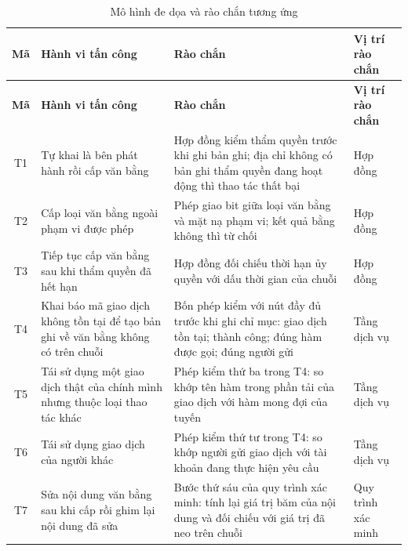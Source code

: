 \begin{longtable}{|c|p{3.6cm}|p{5.3cm}|p{3.4cm}|}
\caption{Mô hình đe dọa và rào chắn tương ứng}
\label{tab:threat-model} \\

\hline
\textbf{Mã} & \textbf{Hành vi tấn công} & \textbf{Rào chắn} & \textbf{Vị trí rào chắn} \\
\hline
\endfirsthead

\hline
\textbf{Mã} & \textbf{Hành vi tấn công} & \textbf{Rào chắn} & \textbf{Vị trí rào chắn} \\
\hline
\endhead

\hline
\endfoot

\hline
\endlastfoot

T1 & Tự khai là bên phát hành rồi cấp văn bằng
& Hợp đồng kiểm thẩm quyền trước khi ghi bản ghi; địa chỉ không có bản ghi thẩm quyền đang hoạt động thì thao tác thất bại
& Hợp đồng
\\ \hline

T2 & Cấp loại văn bằng ngoài phạm vi được phép
& Phép giao bit giữa loại văn bằng và mặt nạ phạm vi; kết quả bằng không thì từ chối
& Hợp đồng
\\ \hline

T3 & Tiếp tục cấp văn bằng sau khi thẩm quyền đã hết hạn
& Hợp đồng đối chiếu thời hạn ủy quyền với dấu thời gian của chuỗi
& Hợp đồng
\\ \hline

T4 & Khai báo mã giao dịch không tồn tại để tạo bản ghi về văn bằng không có trên chuỗi
& Bốn phép kiểm với nút đầy đủ trước khi ghi chỉ mục: giao dịch tồn tại; thành công; đúng hàm được gọi; đúng người gửi
& Tầng dịch vụ
\\ \hline

T5 & Tái sử dụng một giao dịch thật của chính mình nhưng thuộc loại thao tác khác
& Phép kiểm thứ ba trong T4: so khớp tên hàm trong phần tải của giao dịch với hàm mong đợi của tuyến
& Tầng dịch vụ
\\ \hline

T6 & Tái sử dụng giao dịch của người khác
& Phép kiểm thứ tư trong T4: so khớp người gửi giao dịch với tài khoản đang thực hiện yêu cầu
& Tầng dịch vụ
\\ \hline

T7 & Sửa nội dung văn bằng sau khi cấp rồi ghim lại nội dung đã sửa
& Bước thứ sáu của quy trình xác minh: tính lại giá trị băm của nội dung và đối chiếu với giá trị đã neo trên chuỗi
& Quy trình xác minh
\\ \hline


\end{longtable}
